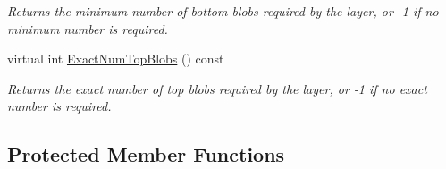 \begin{DoxyCompactItemize}
\begin{DoxyCompactList}\small\item\em Returns the minimum number of bottom blobs required by the layer, or -\/1 if no minimum number is required. \end{DoxyCompactList}\item 
virtual int \mbox{\hyperlink{classcaffe_1_1_concat_layer_a0f19a4cac8676927f9c83010957a2921}{Exact\+Num\+Top\+Blobs}} () const
\begin{DoxyCompactList}\small\item\em Returns the exact number of top blobs required by the layer, or -\/1 if no exact number is required. \end{DoxyCompactList}\end{DoxyCompactItemize}
\subsection*{Protected Member Functions}
